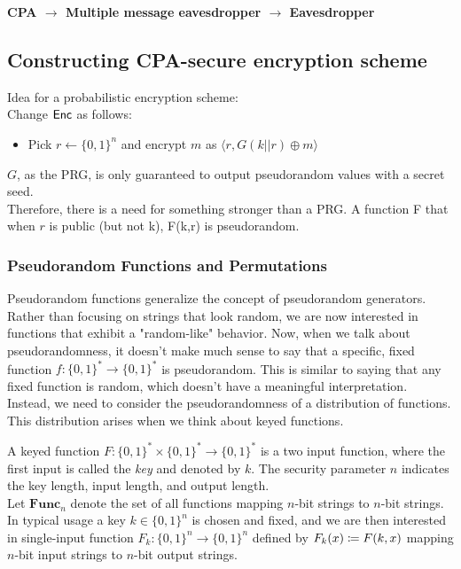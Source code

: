 \documentclass[12pt]{article}
\begin{document}
\textbf{CPA $\rightarrow$ Multiple message eavesdropper $\rightarrow$ Eavesdropper}

\subsection{Constructing CPA-secure encryption scheme}
Idea for a probabilistic encryption scheme:\\
Change $\operatorname{\mathsf{Enc}}$ as follows:\\
\begin{itemize}
\item Pick $r \leftarrow \{0,1\}^n$ and encrypt $m$ as $\langle r, G(k||r)\oplus m \rangle$
\end{itemize}
$G$, as the PRG, is only guaranteed to output pseudorandom values with a secret seed.\\
Therefore, there is a need for something stronger than a PRG. A function F  that when $r$ is public (but not k),  F(k,r) is pseudorandom.
\subsubsection{Pseudorandom Functions and Permutations}
Pseudorandom functions generalize the concept of pseudorandom generators. Rather than focusing on strings that look random, we are now interested in functions that exhibit a "random-like" behavior. Now, when we talk about pseudorandomness, it doesn't make much sense to say that a specific, fixed function $f: \{0,1\}^* \rightarrow \{0,1\}^*$ is pseudorandom. This is similar to saying that any fixed function is random, which doesn't have a meaningful interpretation. Instead, we need to consider the pseudorandomness of a distribution of functions. This distribution arises when we think about keyed functions.

A keyed function $F: \{0,1\}^* \times \{0,1\}^* \rightarrow \{0,1\}^*$ is a two input function, where the first input is called the \emph{key} and denoted by $k$. The security parameter $n$ indicates the key length, input length, and output length. \\

Let $\textbf{Func}_n$ denote the set of all functions mapping $n$-bit strings to $n$-bit strings.
In typical usage a key $k \in \{0,1\}^n$ is chosen and fixed, and we are then interested in single-input function $F_k:  \{0,1\}^n \rightarrow \{0,1\}^n$ defined by $F_k(x) \coloneqq F(k,x)$ mapping $n$-bit input strings to $n$-bit output strings.\\
\end{document}

